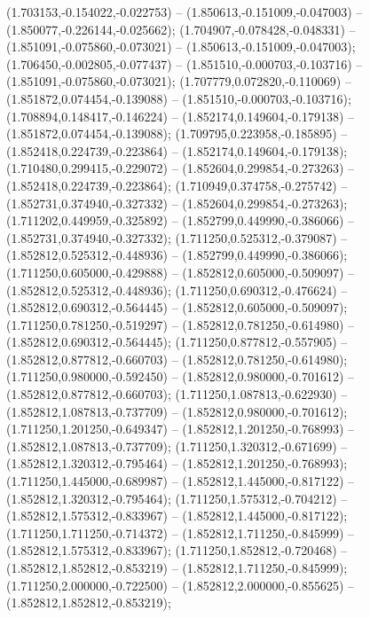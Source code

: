  (1.703153,-0.154022,-0.022753) -- (1.850613,-0.151009,-0.047003) -- (1.850077,-0.226144,-0.025662);
 (1.704907,-0.078428,-0.048331) -- (1.851091,-0.075860,-0.073021) -- (1.850613,-0.151009,-0.047003);
 (1.706450,-0.002805,-0.077437) -- (1.851510,-0.000703,-0.103716) -- (1.851091,-0.075860,-0.073021);
 (1.707779,0.072820,-0.110069) -- (1.851872,0.074454,-0.139088) -- (1.851510,-0.000703,-0.103716);
 (1.708894,0.148417,-0.146224) -- (1.852174,0.149604,-0.179138) -- (1.851872,0.074454,-0.139088);
 (1.709795,0.223958,-0.185895) -- (1.852418,0.224739,-0.223864) -- (1.852174,0.149604,-0.179138);
 (1.710480,0.299415,-0.229072) -- (1.852604,0.299854,-0.273263) -- (1.852418,0.224739,-0.223864);
 (1.710949,0.374758,-0.275742) -- (1.852731,0.374940,-0.327332) -- (1.852604,0.299854,-0.273263);
 (1.711202,0.449959,-0.325892) -- (1.852799,0.449990,-0.386066) -- (1.852731,0.374940,-0.327332);
 (1.711250,0.525312,-0.379087) -- (1.852812,0.525312,-0.448936) -- (1.852799,0.449990,-0.386066);
 (1.711250,0.605000,-0.429888) -- (1.852812,0.605000,-0.509097) -- (1.852812,0.525312,-0.448936);
 (1.711250,0.690312,-0.476624) -- (1.852812,0.690312,-0.564445) -- (1.852812,0.605000,-0.509097);
 (1.711250,0.781250,-0.519297) -- (1.852812,0.781250,-0.614980) -- (1.852812,0.690312,-0.564445);
 (1.711250,0.877812,-0.557905) -- (1.852812,0.877812,-0.660703) -- (1.852812,0.781250,-0.614980);
 (1.711250,0.980000,-0.592450) -- (1.852812,0.980000,-0.701612) -- (1.852812,0.877812,-0.660703);
 (1.711250,1.087813,-0.622930) -- (1.852812,1.087813,-0.737709) -- (1.852812,0.980000,-0.701612);
 (1.711250,1.201250,-0.649347) -- (1.852812,1.201250,-0.768993) -- (1.852812,1.087813,-0.737709);
 (1.711250,1.320312,-0.671699) -- (1.852812,1.320312,-0.795464) -- (1.852812,1.201250,-0.768993);
 (1.711250,1.445000,-0.689987) -- (1.852812,1.445000,-0.817122) -- (1.852812,1.320312,-0.795464);
 (1.711250,1.575312,-0.704212) -- (1.852812,1.575312,-0.833967) -- (1.852812,1.445000,-0.817122);
 (1.711250,1.711250,-0.714372) -- (1.852812,1.711250,-0.845999) -- (1.852812,1.575312,-0.833967);
 (1.711250,1.852812,-0.720468) -- (1.852812,1.852812,-0.853219) -- (1.852812,1.711250,-0.845999);
 (1.711250,2.000000,-0.722500) -- (1.852812,2.000000,-0.855625) -- (1.852812,1.852812,-0.853219);
